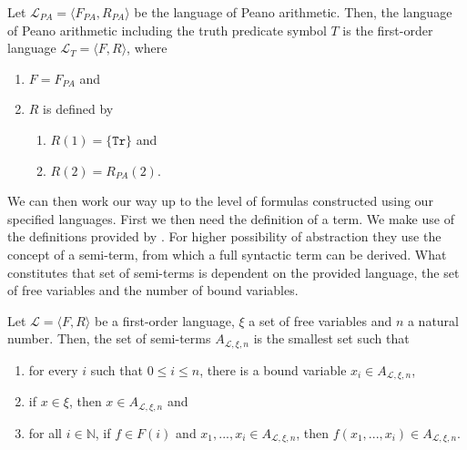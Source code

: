 \begin{definition}\label{def:lt}
    \leanok
    Let $\mathcal{L}_{PA} = \langle F_{PA},R_{PA}\rangle$ be the language of Peano arithmetic. Then, the language of Peano arithmetic including the truth predicate symbol $T$ is the first-order language $\mathcal{L}_T = \langle F, R \rangle$, where
    \begin{enumerate}
        \item $F = F_{PA}$ and
        \item $R$ is defined by
        \begin{enumerate}
            \item $R(1) = \{\texttt{Tr}\}$ and
            \item $R(2) = R_{PA}(2)$.
        \end{enumerate}
    \end{enumerate}
\end{definition}

We can then work our way up to the level of formulas constructed using our specified languages. First we then need the definition of a term. We make use of the definitions provided by \cite{ffl}. For higher possibility of abstraction they use the concept of a semi-term, from which a full syntactic term can be derived. What constitutes that set of semi-terms is dependent on the provided language, the set of free variables and the number of bound variables.

\begin{definition}\label{def:semi-term}
    \leanok
    Let $\mathcal{L} = \langle F, R \rangle$ be a first-order language, $\xi$ a set of free variables and $n$ a natural number. Then, the set of semi-terms $A_{\mathcal{L},\xi,n}$ is the smallest set such that
    \begin{enumerate}
        \item for every $i$ such that $0 \leq i \leq n$, there is a bound variable $x_i \in A_{\mathcal{L},\xi,n}$,
        \item if $x \in \xi$, then $x \in A_{\mathcal{L},\xi,n}$ and
        \item for all $i \in \mathbb{N}$, if $f \in F(i)$ and $x_1,...,x_i \in A_{\mathcal{L},\xi,n}$, then $f(x_1,...,x_i) \in A_{\mathcal{L},\xi,n}$.
    \end{enumerate}
\end{definition}

